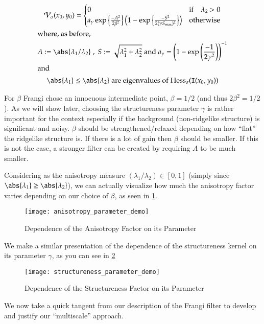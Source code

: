 \begin{gather} \label{eq:frangi-vesselness-measure-v1}
\Vsigma(x_0,y_0) = \begin{cases}
0 & \text{if} \quad \lambda_2 > 0 \\
a_\gamma \exp\left\{\frac{-A^2}{2\beta^2}\right\}
\left(1 - \exp\left\{\frac{-S^2}{2(\gamma S_{\max})^2}\right\}\right) & \text{otherwise}
\end{cases} \\
\shortintertext{where, as before,}
A := \abs{\lambda_1 / \lambda_2}
\;,\;
S := \sqrt{\lambda_1^2 + \lambda_2^2}
\;\textrm{and}\;
a_\gamma = \left(1-\exp\left(\frac{-1}{2\gamma^2}\right)\right)^{-1} \notag\\
\shortintertext{and}
\abs{\lambda_1} \le \abs{\lambda_2}
\; \textrm{are eigenvalues of}\; \Hess_\sigma(\img(x_0, y_0)) \notag
\end{gather}

For $\beta$ Frangi chose an innocuous intermediate point, $\beta=1/2$ (and thus $2\beta^2 = 1/2$).
As we will show later, choosing the structureness parameter $\gamma$ is rather important for the context especially if the background (non-ridgelike structure) is significant and noisy. $\beta$ should be strengthened/relaxed depending on how ``flat'' the ridgelike structure is. If there is a lot of gain then $\beta$ should be smaller. If this is not the case, a stronger filter can be created by requiring $A$ to be much smaller.

Considering as the anisotropy measure $(\lambda_1 / \lambda_2) \in [0,1]$ (simply since $\abs{\lambda_1} \ge \abs{\lambda_2}$), we can actually visualize how much the 
anisotropy factor varies depending on our choice of $\beta$, as seen in \cref{fig:anisotropy-parameter-demo}.

\begin{figure}
  \texttt{[image: anisotropy\_parameter\_demo]}
  \caption{Dependence of the Anisotropy Factor on its Parameter}
  \label{fig:anisotropy-parameter-demo}
\end{figure}

We make a similar presentation of the dependence of the structureness kernel on its parameter $\gamma$, as you can see in
\cref{fig:structureness-parameter-demo}
\begin{figure}
  \texttt{[image: structureness\_parameter\_demo]}
  \caption{Dependence of the Structureness Factor on its Parameter}
  \label{fig:structureness-parameter-demo}
\end{figure}

	We now take a quick tangent from our description of the Frangi filter to develop and justify our ``multiscale'' approach.